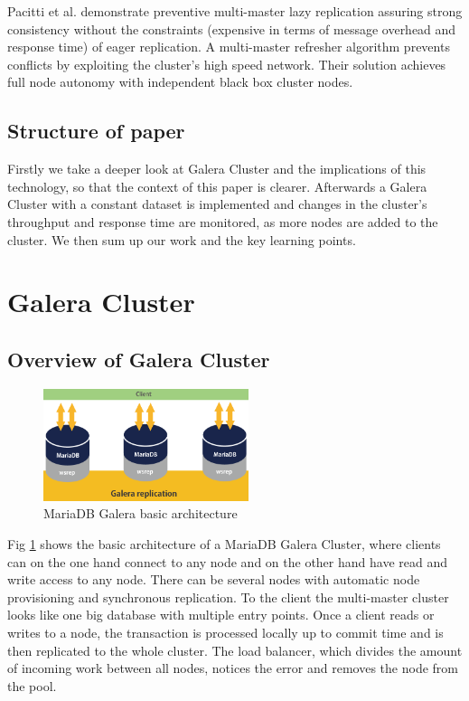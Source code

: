 \documentclass{sig-alternate}
\begin{document}
Pacitti et al. \cite{pacitti2003preventive} demonstrate preventive multi-master lazy replication assuring strong consistency without the constraints (expensive in terms of message overhead and response time) of eager replication. A multi-master refresher algorithm prevents conflicts by exploiting the cluster’s high speed network. Their solution achieves full node autonomy with independent black box cluster nodes.

\bigskip

\subsection{Structure of paper}
Firstly we take a deeper look at Galera Cluster and the implications of this technology, so that the context of this paper is clearer. Afterwards a Galera Cluster with a constant dataset is implemented and changes in the cluster’s throughput and response time are monitored, as more nodes are added to the cluster. We then sum up our work and the key learning points.

\section{Galera Cluster}
\subsection{Overview of Galera Cluster}

\begin{figure}[ht]
	\centering
	\includegraphics[width=6cm]{galera1.png}
	\caption{MariaDB Galera basic architecture \cite{xyxon}}
	\label{fig:galera_structure}
\end{figure}

Fig \ref{fig:galera_structure} shows the basic architecture of a MariaDB Galera Cluster, where clients can on the one hand connect to any node and on the other hand have read and write access to any node. There can be several nodes with automatic node provisioning and synchronous replication. To the client the multi-master cluster looks like one big database with multiple entry points. Once a client reads or writes to a node, the transaction is processed locally up to commit time and is then replicated to the whole cluster. The load balancer, which divides the amount of incoming work between all nodes, notices the error and removes the node from the pool.
\end{document}
